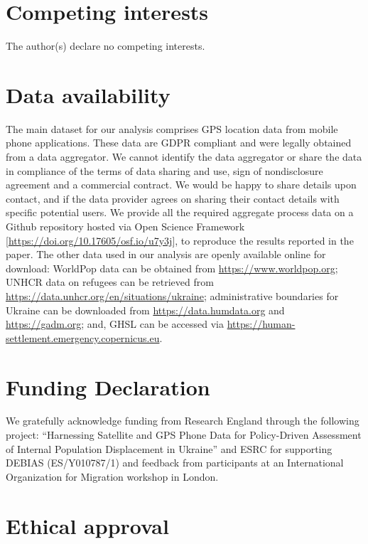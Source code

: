 \documentclass[
  sn-nature,
  11pt,
]{sn-jnl}
\begin{document}
\section{Competing interests}\label{competing-interests}

The author(s) declare no competing interests.

\section{Data availability}\label{data-availability}

The main dataset for our analysis comprises GPS location data from
mobile phone applications. These data are GDPR compliant and were
legally obtained from a data aggregator. We cannot identify the data
aggregator or share the data in compliance of the terms of data sharing
and use, sign of nondisclosure agreement and a commercial contract. We
would be happy to share details upon contact, and if the data provider
agrees on sharing their contact details with specific potential users.
We provide all the required aggregate process data on a Github
repository hosted via Open Science Framework
{[}\href{https://doi.org/10.17605/OSF.IO/U7Y3J}{https://doi.org/10.17605/osf.io/u7y3j}{]},
to reproduce the results reported in the paper. The other data used in
our analysis are openly available online for download: WorldPop data can
be obtained from \url{https://www.worldpop.org}; UNHCR data on refugees
can be retrieved from
\url{https://data.unhcr.org/en/situations/ukraine}; administrative
boundaries for Ukraine can be downloaded from
\url{https://data.humdata.org} and \url{https://gadm.org}; and, GHSL can
be accessed via \url{https://human-settlement.emergency.copernicus.eu}.

\section{Funding Declaration}\label{funding-declaration}

We gratefully acknowledge funding from Research England through the
following project: ``Harnessing Satellite and GPS Phone Data for
Policy-Driven Assessment of Internal Population Displacement in
Ukraine'' and ESRC for supporting DEBIAS (ES/Y010787/1) and feedback
from participants at an International Organization for Migration
workshop in London.

\section{Ethical approval}\label{ethical-approval}
\end{document}

